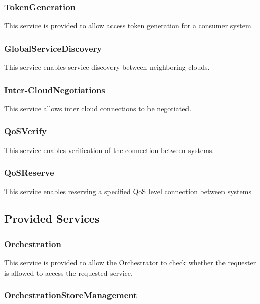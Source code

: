 \documentclass[a4paper]{arrowhead}
\newcommand{\spdef}[2]{{\textcolor{ArrowheadBlue}{#2\label{sec:services:produced:#1}}}}
\begin{document}
\subsubsection{\spdef{TokenGeneration}{TokenGeneration}}

This service is provided to allow access token generation for a consumer system.

\subsubsection{\spdef{GlobalServiceDiscovery}{GlobalServiceDiscovery}}

This service enables service discovery between neighboring clouds.

\subsubsection{\spdef{Inter-CloudNegotiations}{Inter-CloudNegotiations}}

This service allows inter cloud connections to be negotiated.

\subsubsection{\spdef{QoSVerify}{QoSVerify}}

This service enables verification of the connection between systems.

\subsubsection{\spdef{QoSReserve}{QoSReserve}}

This service enables reserving a specified QoS level connection between systems

\subsection{Provided Services}

\subsubsection{\spdef{Orchestration}{Orchestration}}

This service is provided to allow the Orchestrator to check whether the requester is allowed to access the requested service. 

\subsubsection{\spdef{OrchestrationStoreManagement}{OrchestrationStoreManagement}}
\end{document}
